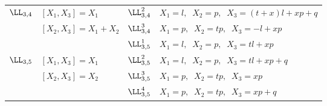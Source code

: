 \begin{table}
\begin{center}
\begin{tabular}{|l|l|l|l|}
\cline{3-4}
$\LL_{3,4}$ & $[X_1,X_3]=X_1$ & $\LL_{3,4}^2$ &
$ X_1=l,\;\;X_2=p,\;\;X_3=(t+x)l+xp+q$ \\
\cline{3-4}
 & $[X_2,X_3]=X_1+X_2$ & $\LL_{3,4}^3$ & $X_1=p,\;\; X_2=tp,\;\; 
 X_3=-l+xp$\\
\hline
  &  & $\LL_{3,5}^1$ & $X_1=l,\;\;X_2=p,\;\;X_3=tl+xp$\\
\cline{3-4}
$\LL_{3,5}$ & $[X_1,X_3]=X_1$ & $\LL_{3,5}^2$ &
$ X_1=l,\;\;X_2=p,\;\;X_3=tl+xp+q$ \\
\cline{3-4}
 & $[X_2,X_3]=X_2$ & $\LL_{3,5}^3$ & $X_1=p,\;\; X_2=tp,\;\; 
 X_3=xp$\\
 &  & $\LL_{3,5}^4$ & $ X_1=p,\;\;X_2=tp,\;\;X_3=xp+q$\\
\hline
\end{tabular}
\end{center}
\end{table}

\setcounter{table}{0}

